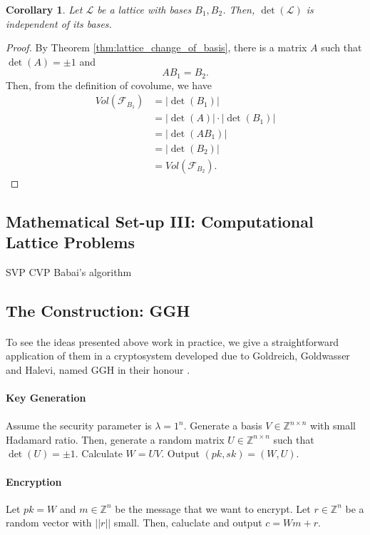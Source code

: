 \documentclass{article}
\newtheorem{corollary}{Corollary}[theorem]
\theoremstyle{definition}
\renewcommand{\L}{\mathcal{L}}
\newcommand{\F}{\mathcal{F}}
\newcommand{\Int}{\mathbb{Z}}
\newcommand{\norm}[1]{||#1||}
\begin{document}
\begin{corollary}
  Let $\L$ be a lattice with bases $B_1, B_2$. Then, $\det(\L)$ is independent
  of its bases.
\end{corollary}
\begin{proof}
  By Theorem \ref{thm:lattice_change_of_basis}, there is a matrix $A$ such that
  $\det(A) = \pm 1$ and
  \[
    AB_1 = B_2.
  \]
  Then, from the definition of covolume, we have
  \begin{align*}
    Vol(\F_{B_1}) &= |\det(B_1)| \\
                  &= |\det(A)| \cdot |\det(B_1)| \\
                  &= |\det(AB_1) | \\
                  &= |\det(B_2)| \\
                  &= Vol(\F_{B_2}).
  \end{align*}
\end{proof}
\subsection{Mathematical Set-up III: Computational Lattice Problems}
SVP
CVP
Babai's algorithm
\subsection{The Construction: GGH}
\paragraph{} To see the ideas presented above work in practice, we give a
straightforward application of them in a cryptosystem developed due to
Goldreich, Goldwasser and Halevi, named GGH in their honour \cite{goldreich1997public}.
\paragraph{Key Generation}
\paragraph{} Assume the security parameter is $\lambda = 1^n$. Generate a basis
$V \in \Int^{n\times n}$ with small Hadamard ratio. Then, generate a random matrix
$U \in \Int^{n\times n}$ such that $\det(U) = \pm 1$. Calculate $W = UV$. Output
$(pk, sk) = (W, U)$.
\paragraph{Encryption}
Let $pk = W$ and $m \in \Int^n$ be the message that we want to encrypt. Let $r
\in \Int^n$ be a random vector with $\norm{r}$ small. Then, caluclate and output
$c = Wm + r$.
\end{document}
